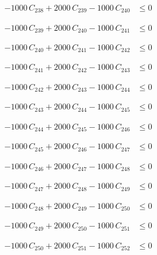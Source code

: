 \documentclass[a4paper,11pt]{article}
\begin{document}
\begin{align}
-1000\,C_{238} + 2000\,C_{239} - 1000\,C_{240} &\leq 0 \nonumber
\end{align}

\begin{align}
-1000\,C_{239} + 2000\,C_{240} - 1000\,C_{241} &\leq 0 \nonumber
\end{align}

\begin{align}
-1000\,C_{240} + 2000\,C_{241} - 1000\,C_{242} &\leq 0 \nonumber
\end{align}

\begin{align}
-1000\,C_{241} + 2000\,C_{242} - 1000\,C_{243} &\leq 0 \nonumber
\end{align}

\begin{align}
-1000\,C_{242} + 2000\,C_{243} - 1000\,C_{244} &\leq 0 \nonumber
\end{align}

\begin{align}
-1000\,C_{243} + 2000\,C_{244} - 1000\,C_{245} &\leq 0 \nonumber
\end{align}

\begin{align}
-1000\,C_{244} + 2000\,C_{245} - 1000\,C_{246} &\leq 0 \nonumber
\end{align}

\begin{align}
-1000\,C_{245} + 2000\,C_{246} - 1000\,C_{247} &\leq 0 \nonumber
\end{align}

\begin{align}
-1000\,C_{246} + 2000\,C_{247} - 1000\,C_{248} &\leq 0 \nonumber
\end{align}

\begin{align}
-1000\,C_{247} + 2000\,C_{248} - 1000\,C_{249} &\leq 0 \nonumber
\end{align}

\begin{align}
-1000\,C_{248} + 2000\,C_{249} - 1000\,C_{250} &\leq 0 \nonumber
\end{align}

\begin{align}
-1000\,C_{249} + 2000\,C_{250} - 1000\,C_{251} &\leq 0 \nonumber
\end{align}

\begin{align}
-1000\,C_{250} + 2000\,C_{251} - 1000\,C_{252} &\leq 0 \nonumber
\end{align}
\end{document}
